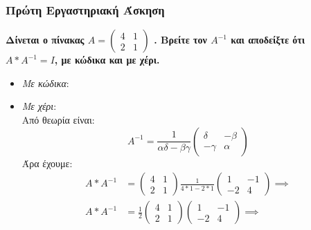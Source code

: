 \documentclass[a4paper,12pt]{article}
\begin{document}
\newpage\subsubsection{Πρώτη Εργαστηριακή Άσκηση}
\textbf{Δίνεται ο πίνακας
$A =
    \begin{pmatrix}
        4 & 1 \\
        2 & 1
    \end{pmatrix}$
.
Βρείτε τον
$Α^{-1}$ και αποδείξτε ότι
$A*A^{-1}=Ι$,
με κώδικα και με χέρι.}

\begin{itemize}
    \item \textit{Με κώδικα}:
          
    \item \textit{Με χέρι}:\\
          Από θεωρία είναι:
          \begin{equation*}
              A^{-1} = \frac{1}{\alpha\delta-\beta\gamma}
              \begin{pmatrix}
                  \delta  & -\beta \\
                  -\gamma & \alpha
              \end{pmatrix}
          \end{equation*}
          Άρα έχουμε:
          \begin{equation*}
              \begin{split}
                  A*A^{-1}&=
                  \begin{pmatrix}
                      4 & 1 \\
                      2 & 1
                  \end{pmatrix}
                  \frac{1}{4*1-2*1}
                  \begin{pmatrix}
                      1  & -1 \\
                      -2 & 4
                  \end{pmatrix} \implies \\
                  A*A^{-1}&=
                  \frac{1}{2}
                  \begin{pmatrix}
                      4 & 1 \\
                      2 & 1
                  \end{pmatrix}\begin{pmatrix}
                      1  & -1 \\
                      -2 & 4
                  \end{pmatrix} \implies \\

\end{split}
\end{equation*}
\end{itemize}
\end{document}
